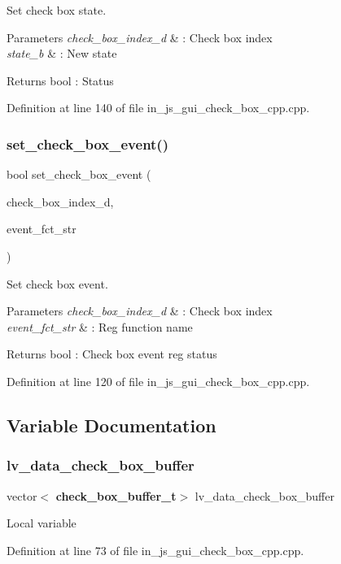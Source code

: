 Set check box state. 


\begin{DoxyParams}{Parameters}
{\em check\+\_\+box\+\_\+index\+\_\+d} & \+: Check box index \\
\hline
{\em state\+\_\+b} & \+: New state \\
\hline
\end{DoxyParams}
\begin{DoxyReturn}{Returns}
bool \+: Status 
\end{DoxyReturn}


Definition at line 140 of file in\+\_\+js\+\_\+gui\+\_\+check\+\_\+box\+\_\+cpp.\+cpp.

\mbox{\label{group___check__box_ga0806a33469976f628de37adde1f4a4a0}} 
\subsubsection{set\_check\_box\_event()}
{\footnotesize\ttfamily bool set\+\_\+check\+\_\+box\+\_\+event (\begin{DoxyParamCaption}\item[{double}]{check\+\_\+box\+\_\+index\+\_\+d,  }\item[{wx\+String}]{event\+\_\+fct\+\_\+str }\end{DoxyParamCaption})}



Set check box event. 


\begin{DoxyParams}{Parameters}
{\em check\+\_\+box\+\_\+index\+\_\+d} & \+: Check box index \\
\hline
{\em event\+\_\+fct\+\_\+str} & \+: Reg function name \\
\hline
\end{DoxyParams}
\begin{DoxyReturn}{Returns}
bool \+: Check box event reg status 
\end{DoxyReturn}


Definition at line 120 of file in\+\_\+js\+\_\+gui\+\_\+check\+\_\+box\+\_\+cpp.\+cpp.



\subsection{Variable Documentation}
\mbox{\label{group___check__box_gafd5502a3268148ed92bef51643dc7b8d}} 
\subsubsection{lv\_data\_check\_box\_buffer}
{\footnotesize\ttfamily vector$<$\textbf{ check\+\_\+box\+\_\+buffer\+\_\+t}$>$ lv\+\_\+data\+\_\+check\+\_\+box\+\_\+buffer}

Local variable 

Definition at line 73 of file in\+\_\+js\+\_\+gui\+\_\+check\+\_\+box\+\_\+cpp.\+cpp.

